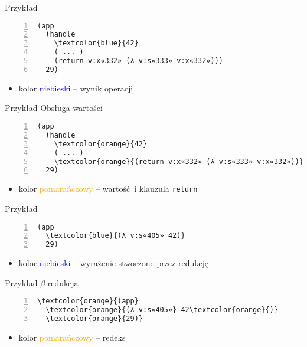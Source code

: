 \documentclass{beamer}
\begin{document}
\begin{frame}[fragile]{Przykład}
\begin{Verbatim}[commandchars=\\\{\},numbers=left]
(app
  (handle
    \textcolor{blue}{42}
    ( ... )
    (return v:x«332» (λ v:s«333» v:x«332»)))
  29)
\end{Verbatim}
\begin{itemize}
  \item kolor \textcolor{blue}{niebieski} -- wynik operacji
\end{itemize}
\end{frame}

\begin{frame}[fragile]{Przykład}
Obsługa wartości
\begin{Verbatim}[commandchars=\\\{\},numbers=left]
(app
  (handle
    \textcolor{orange}{42}
    ( ... )
    \textcolor{orange}{(return v:x«332» (λ v:s«333» v:x«332»))})
  29)
\end{Verbatim}
\begin{itemize}
  \item kolor \textcolor{orange}{pomarańczowy} -- wartość i klauzula \texttt{return}
\end{itemize}
\end{frame}

\begin{frame}[fragile]{Przykład}
\begin{Verbatim}[commandchars=\\\{\},numbers=left]
(app 
  \textcolor{blue}{(λ v:s«405» 42)}
  29)
\end{Verbatim}
\begin{itemize}
  \item kolor \textcolor{blue}{niebieski} -- wyrażenie stworzone przez redukcję
\end{itemize}
\end{frame}

\begin{frame}[fragile]{Przykład}
$\beta$-redukcja
\begin{Verbatim}[commandchars=\\\{\},numbers=left]
\textcolor{orange}{(app}
  \textcolor{orange}{(λ v:s«405»} 42\textcolor{orange}{)}
  \textcolor{orange}{29)}
\end{Verbatim}
\begin{itemize}
  \item kolor \textcolor{orange}{pomarańczowy} -- redeks
\end{itemize}
\end{frame}
\end{document}
